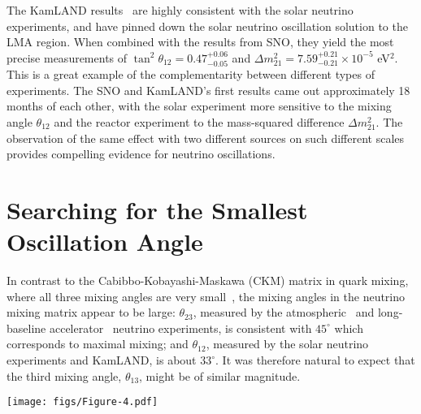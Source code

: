 \documentclass[aps,twocolumn,preprintnumbers,amsmath,superscriptaddress,amssymb,floats,nofootinbib]{revtex4-1}
\begin{document}
The KamLAND results~\cite{Kamland03,Kamland05,Kamland08} are highly consistent with the solar neutrino experiments, and have pinned down the solar neutrino oscillation solution to the LMA region. When combined with the results from SNO, they yield the most precise measurements of $\tan^2\theta_{12} = 0.47^{+0.06}_{-0.05}$ and $\Delta m^2_{21} = 7.59^{+0.21}_{-0.21} \times 10^{-5}$ eV$^2$. 
This is a great example of the complementarity between different types of experiments. The SNO and KamLAND's first results came out approximately 18 months of each other, with the solar experiment more sensitive to the mixing angle $\theta_{12}$ and the reactor experiment to the mass-squared difference $\Delta m^2_{21}$. The observation of the same effect with two different sources on such different scales provides compelling evidence for neutrino oscillations.


\section{Searching for the Smallest Oscillation Angle} 
\label{sec:theta13}
In contrast to the  Cabibbo-Kobayashi-Maskawa (CKM) matrix in quark mixing, where all three mixing angles are very small~\cite{PDG14}, the mixing angles in the neutrino mixing matrix appear to be large: $\theta_{23}$, measured by the atmospheric~\cite{Kajita} and long-baseline accelerator~\cite{Feldman} neutrino experiments, is consistent with $45^\circ$ which corresponds to maximal mixing; and $\theta_{12}$, measured by the solar neutrino experiments and KamLAND, is about $33^\circ$. It was therefore natural to expect that the third mixing angle, $\theta_{13}$, might be of similar magnitude.

\begin{figure*}[tb]
  \centering
  \texttt{[image: figs/Figure-4.pdf]}
  \caption{ \label{fig:dayabay}{\bf Results from Daya Bay.} (a) The data points show the ratio of the detected to expected no-oscillation $\bar\nu_{e}$ signals at the 8 antineutrino detectors (ADs) located in three experimental halls as a function of the effective baseline. 
  A $\sim$6\% signal deficit at the far hall relative to the near halls is observed. 
  The oscillation survival probability at the best-fit value is given by the red curve.
  (b) The data points show the ratio of the background-subtracted $\bar\nu_e$ spectrum to the expectation for no-oscillation in the three experimental halls as a function of $L_{\textrm{eff}}/E_{\nu}$. The effective baseline $L_{\textrm{eff}}$ is determined for each experimental hall (EH) equating the multi-core oscillated flux to an effective oscillated flux from a single baseline. A near-complete cycle of the expected periodic oscillation feature is observed. The oscillation survival probability using the best estimates of $\theta_{13}$ and $|\Delta{m}^2_{31}|$ is given by the red curve. Figures are reproduced, with permission, from Ref.~\cite{Zhang-Neutrino14}.}
\end{figure*}
\end{document}
